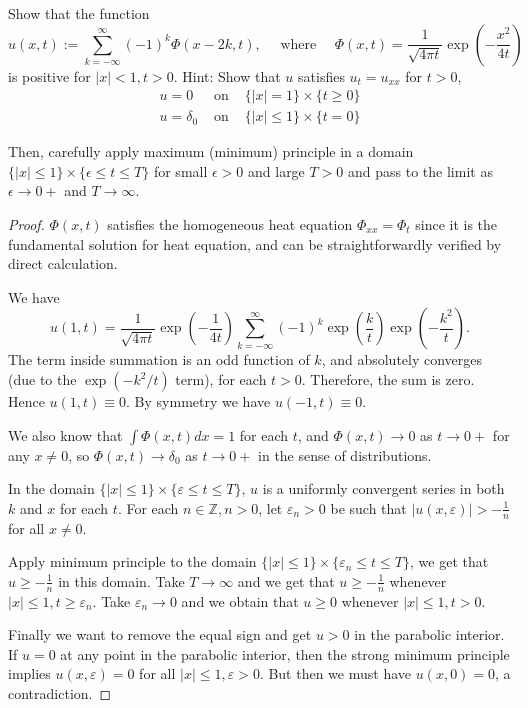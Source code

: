 
\begin{problem}
	Show that the function
\[
u(x, t):=\sum_{k=-\infty}^{\infty}(-1)^k \Phi(x-2 k, t), \quad \text { where } \quad \Phi(x, t)=\frac{1}{\sqrt{4 \pi t}} \exp \left(-\frac{x^2}{4 t}\right)
\]
is positive for $|x|<1, t>0$.
Hint: Show that $u$ satisfies $u_t=u_{x x}$ for $t>0$,
\[
\begin{array}{rll}
u=0 & \text { on } & \{|x|=1\} \times\{t \geq 0\} \\
u=\delta_0 & \text { on } & \{|x| \leq 1\} \times\{t=0\}
\end{array}
\]

Then, carefully apply maximum (minimum) principle in a domain $\{|x| \leq 1\} \times\{\epsilon \leq t \leq T\}$ for small $\epsilon>0$ and large $T>0$ and pass to the limit as $\epsilon \rightarrow 0+$ and $T \rightarrow \infty$.
\end{problem}
\begin{proof}
	$\Phi(x, t) $ satisfies the homogeneous heat equation $\Phi_{xx} = \Phi_t$ since it is the fundamental solution for heat equation, and can be straightforwardly verified by direct calculation.

	We have
	\[
		u(1, t) = \frac{1}{\sqrt{4 \pi t} } \exp\left( - \frac{1}{4 t} \right) \sum_{k = - \infty }^{\infty } (-1)^k \exp\left( \frac{k}{t} \right) \exp\left( - \frac{k^2}{t} \right) 
	.\] 
	The term inside summation is an odd function of $k$, and absolutely converges (due to the $\exp\left( - k^2 / t \right) $ term), for each $t > 0$. Therefore, the sum is zero. Hence $u(1, t) \equiv 0$. By symmetry we have $u(-1, t) \equiv 0$.

	We also know that $\int \Phi(x, t) dx  = 1$ for each $t$, and $\Phi(x, t) \to 0$ as $t \to  0+$ for any $x \neq 0$, so $\Phi(x, t) \to  \delta_0$ as $t\to 0+$ in the sense of distributions.

	In the domain $\{|x| \le 1\} \times \{\varepsilon \le t \le T\} $, $u$ is a uniformly convergent series in both $k$ and $x$ for each $t$. For each $n \in \mathbb{Z}, n > 0$, let $\varepsilon_n>0$ be such that $|u(x, \varepsilon)| > -\frac{1}{n}$ for all $x\neq 0$. 

	Apply minimum principle to the domain $\{|x| \le 1\} \times \{\varepsilon_n \le t \le T\} $, we get that $u \ge  - \frac{1}{n}$ in this domain. Take $T \to \infty $ and we get that $u \ge  - \frac{1}{n}$ whenever  $|x| \le 1, t \ge \varepsilon_n$. Take $\varepsilon_n \to  0$ and we obtain that $u \ge 0$ whenever $|x| \le 1, t > 0$.

	Finally we want to remove the equal sign and get $u > 0$ in the parabolic interior. If $u = 0$ at any point in the parabolic interior, then the strong minimum principle implies $u(x, \varepsilon) = 0$ for all $|x| \le 1, \varepsilon > 0$. But then we must have $u(x, 0) = 0$, a contradiction.
\end{proof}


